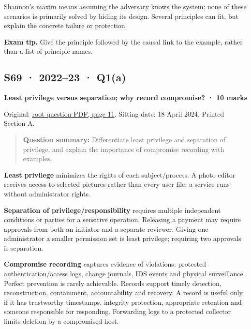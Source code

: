 \documentclass[11pt,a4paper]{article}
\begin{document}
Shannon's maxim means assuming the adversary knows the system; none of these scenarios is primarily solved by hiding its design. Several principles can fit,\allowbreak{} but explain the concrete failure or protection.



{\color{ForestGreen}\textbf{Exam tip.} Give the principle followed by the causal link to the example,\allowbreak{} rather than a list of principle names.}




\clearpage
\subsection{S69 · 2022–23 · Q1(a)}\label{s69}

\textbf{Least privilege versus separation; why record compromise? · 10 marks}


Original: \href{../../CSE405-Security_Merged.pdf\#page=11}{root question PDF,\allowbreak{} page 11}. Sitting date: 18 April 2024. Printed Section A.



\begin{quote}\small

\textbf{Question summary:} Differentiate least privilege and separation of privilege,\allowbreak{} and explain the importance of compromise recording with examples.



\end{quote}

\textbf{Least privilege} minimizes the rights of each subject/\allowbreak{}process. A photo editor receives access to selected pictures rather than every user file; a service runs without administrator rights.


\textbf{Separation of privilege/\allowbreak{}responsibility} requires multiple independent conditions or parties for a sensitive operation. Releasing a payment may require approvals from both an initiator and a separate reviewer. Giving one administrator a smaller permission set is least privilege; requiring two approvals is separation.


\textbf{Compromise recording} captures evidence of violations: protected authentication/\allowbreak{}access logs,\allowbreak{} change journals,\allowbreak{} IDS events and physical surveillance. Perfect prevention is rarely achievable. Records support timely detection,\allowbreak{} reconstruction,\allowbreak{} containment,\allowbreak{} accountability and recovery. A record is useful only if it has trustworthy timestamps,\allowbreak{} integrity protection,\allowbreak{} appropriate retention and someone responsible for responding. Forwarding logs to a protected collector limits deletion by a compromised host.
\end{document}
